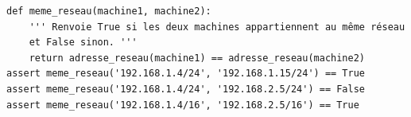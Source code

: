 \documentclass[11pt, a4paper]{report}
\begin{document}
\begin{enumerate}[resume]
   \begin{verbatim}
def meme_reseau(machine1, machine2):
    ''' Renvoie True si les deux machines appartiennent au même réseau 
    et False sinon. '''
    return adresse_reseau(machine1) == adresse_reseau(machine2)
assert meme_reseau('192.168.1.4/24', '192.168.1.15/24') == True
assert meme_reseau('192.168.1.4/24', '192.168.2.5/24') == False
assert meme_reseau('192.168.1.4/16', '192.168.2.5/16') == True

\end{verbatim}



      \end{enumerate}

    
\end{document}
